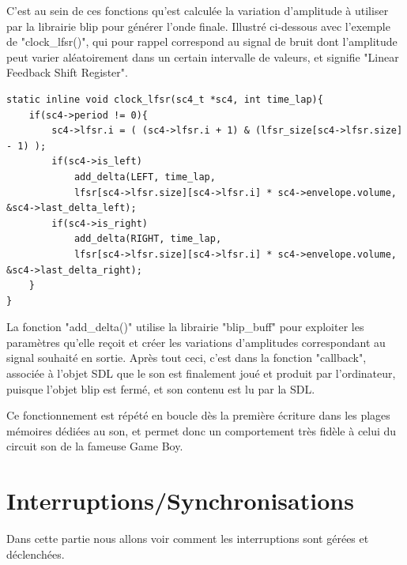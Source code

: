 \documentclass{report}
\begin{document}
C'est au sein de ces fonctions qu'est calculée la variation d'amplitude à utiliser par la librairie blip pour générer l'onde finale.
Illustré ci-dessous avec l'exemple de "clock\_lfsr()", qui pour rappel correspond au signal de bruit dont l'amplitude peut varier aléatoirement dans 
un certain intervalle de valeurs, et signifie "Linear Feedback Shift Register".
\begin{lstlisting}
static inline void clock_lfsr(sc4_t *sc4, int time_lap){
	if(sc4->period != 0){
		sc4->lfsr.i = ( (sc4->lfsr.i + 1) & (lfsr_size[sc4->lfsr.size] - 1) );
		if(sc4->is_left)
			add_delta(LEFT, time_lap,
			lfsr[sc4->lfsr.size][sc4->lfsr.i] * sc4->envelope.volume, &sc4->last_delta_left);
		if(sc4->is_right)
			add_delta(RIGHT, time_lap,
			lfsr[sc4->lfsr.size][sc4->lfsr.i] * sc4->envelope.volume, &sc4->last_delta_right);
	}
}
\end{lstlisting}

La fonction "add\_delta()" utilise la librairie "blip\_buff" pour exploiter les paramètres qu'elle reçoit et créer 
les variations d'amplitudes correspondant au signal souhaité en sortie.
Après tout ceci, c'est dans la fonction "callback", associée à l'objet SDL que le son est finalement joué et produit par l'ordinateur, puisque l'objet blip est fermé, et son contenu est lu par la SDL.

Ce fonctionnement est répété en boucle dès la première écriture dans les plages mémoires dédiées au son, et permet donc un comportement très fidèle à celui du circuit son de la fameuse Game Boy.
\section{Interruptions/Synchronisations}
Dans cette partie nous allons voir comment les interruptions sont gérées et déclenchées. 
\end{document}
